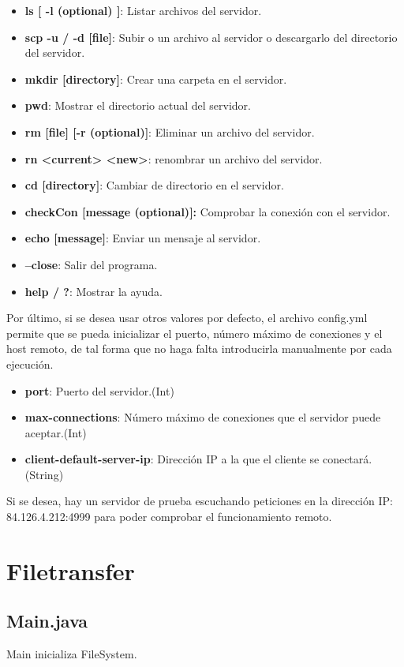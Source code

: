 \documentclass[a4paper, 12pt]{report}
\begin{document}
\begin{itemize}
	\item \textbf{ls [ -l (optional) ]}: Listar archivos del servidor.
	\item \textbf{scp -u / -d [file]}: Subir o un archivo al servidor o descargarlo del directorio del servidor.
	\item \textbf{mkdir [directory]}: Crear una carpeta en el servidor.
	\item \textbf{pwd}: Mostrar el directorio actual del servidor.
	\item \textbf{rm [file] [-r (optional)]}: Eliminar un archivo del servidor.
	\item \textbf{rn <current> <new>}: renombrar un archivo del servidor.
	\item \textbf{cd [directory]}: Cambiar de directorio en el servidor.
	\item \textbf{checkCon [message (optional)]:} Comprobar la conexión con el servidor.
	\item \textbf{echo [message]}: Enviar un mensaje al servidor.
	\item \textbf{--close}: Salir del programa.
	\item \textbf{help / ?}: Mostrar la ayuda.
\end{itemize}

Por último, si se desea usar otros valores por defecto, el archivo config.yml permite que se pueda inicializar el puerto, número máximo de conexiones y el host remoto, de tal forma que no haga falta introducirla manualmente por cada ejecución.
\begin{itemize}
	\item \textbf{port}: Puerto del servidor.(Int)
	\item \textbf{max-connections}: Número máximo de conexiones que el servidor puede aceptar.(Int)
	\item \textbf{client-default-server-ip}: Dirección IP a la que el cliente se conectará.(String)

\end{itemize}
Si se desea, hay un servidor de prueba escuchando peticiones en la dirección IP: 84.126.4.212:4999 para poder comprobar el funcionamiento remoto.


\chapter{Filetransfer}

\section{Main.java}
Main inicializa FileSystem.
\end{document}
